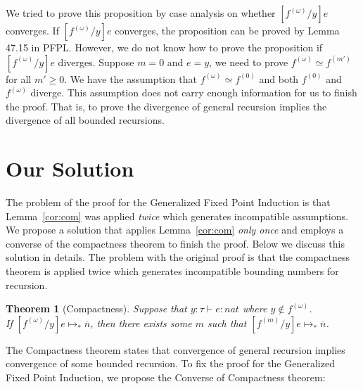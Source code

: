 \documentclass{article}
\newtheorem{theorem}{Theorem}
\begin{document}
We tried to prove this proposition by case analysis on whether
$[f^{(\omega)}/y]e$ converges.
If $[f^{(\omega)}/y]e$ converges, the proposition can be proved by Lemma 47.15 in PFPL.
However, we do not know how to prove
the proposition if $[f^{(\omega)}/y]e$ diverges.
Suppose $m = 0$ and $e = y$, we need to prove
$f^{(\omega)}\simeq f^{(m')}$ for all $m'\ge 0$.
We have the assumption that
$f^{(\omega)}\simeq f^{(0)}$ and both $f^{(0)}$ and $f^{(\omega)}$ diverge.
This assumption does not carry enough information for us to finish the proof. 
That is, to prove the divergence of general recursion implies the divergence of all bounded recursions.

\section{Our Solution}
\label{sec:solution}

The problem of the proof for the Generalized Fixed Point Induction is
that Lemma~\ref{cor:com} was applied \emph{twice} which generates
incompatible assumptions. We propose a solution that applies
Lemma~\ref{cor:com} \emph{only once} and employs a converse of the compactness
theorem to finish the proof. Below we discuss this solution in details.
The problem with the original proof is that the compactness theorem is applied twice which generates incompatible bounding numbers for recursion.

\begin{theorem}[Compactness]
  Suppose that $y:\tau\vdash e:\textit{nat}$ where $y\notin f^{(\omega)}$. \\
  If $[f^{(\omega)}/y]e\longmapsto_*\overline{n}$, then there exists some $m$ such that $[f^{(m)}/y]e\longmapsto_*\overline{n}$.
\end{theorem}

The Compactness theorem states that convergence of general recursion implies convergence of some bounded recursion.
To fix the proof for the Generalized Fixed Point Induction, we propose the Converse of Compactness theorem:
\end{document}
